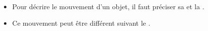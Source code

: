 \begin{mybilan}
	\begin{itemize}		
		\item Pour décrire le mouvement d'un objet, il faut préciser sa  et la .
		
		\item Ce mouvement peut être différent suivant le .
	\end{itemize}
\end{mybilan}